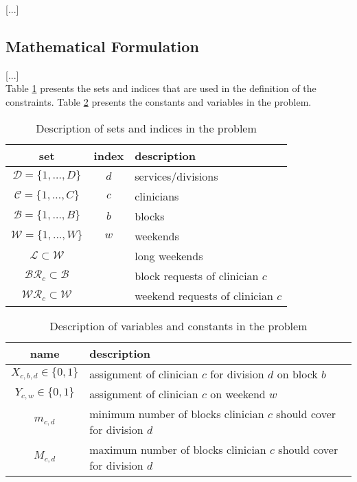 [...]

\subsection{Mathematical Formulation}
[...] \\

Table \ref{tbl:sets-indices} presents the sets and indices that are used in the definition of the constraints. Table \ref{tbl:variables-constants} presents the constants and variables in the problem.

\begin{table}[h]
	\centering
	\begin{tabular}{ c c l }
		\hline
		set                                  & index & description                       \\ \hline
		$\mathcal{D} = \{1, \ldots, D \}$    & $d$   & services/divisions                \\
		$\mathcal{C} = \{1, \ldots, C \}$    & $c$   & clinicians                        \\
		$\mathcal{B} = \{1, \ldots, B \}$    & $b$   & blocks                            \\
		$\mathcal{W} = \{1, \ldots, W \}$    & $w$   & weekends                          \\
		$\mathcal{L} \subset \mathcal{W}$    &       & long weekends                     \\
		$\mathcal{BR}_c \subset \mathcal{B}$ &       & block requests of clinician $c$   \\
		$\mathcal{WR}_c \subset \mathcal{W}$ &       & weekend requests of clinician $c$
	\end{tabular}
	\caption{Description of sets and indices in the problem}
	\label{tbl:sets-indices}
\end{table}

\begin{table}[h]
	\centering
	\begin{tabular}{ c l }
		\hline
		name                       & description                                                          \\ \hline
		$X_{c, b, d} \in \{0, 1\}$ & assignment of clinician $c$ for division $d$ on block $b$            \\
		$Y_{c, w} \in \{0, 1\}$    & assignment of clinician $c$ on weekend $w$                           \\
		$m_{c, d}$                 & minimum number of blocks clinician $c$ should cover for division $d$ \\
		$M_{c, d}$                 & maximum number of blocks clinician $c$ should cover for division $d$
	\end{tabular}
	\caption{Description of variables and constants in the problem}
	\label{tbl:variables-constants}
\end{table}